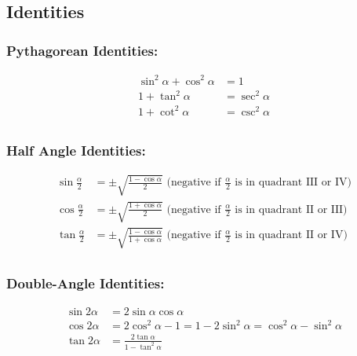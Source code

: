 \documentclass[
]{book}
\begin{document}
\hypertarget{identities-1}{%
\subsection*{Identities}\label{identities-1}}

\hypertarget{pythagorean-identities}{%
\subsubsection*{Pythagorean Identities:}\label{pythagorean-identities}}

\begin{align}
\sin^2{\alpha} + \cos^2{\alpha} &= 1 \\
1 + \tan^2{\alpha} &= \sec^2{\alpha} \\
1 + \cot^2{\alpha} &= \csc^2{\alpha} \\
\end{align}

\hypertarget{half-angle-identities}{%
\subsubsection*{Half Angle Identities:}\label{half-angle-identities}}

\begin{align}
\sin{\frac{\alpha}{2}} &= \pm \sqrt{\frac{1 - \cos{\alpha}}{2}} \text{ (negative if } \frac{\alpha}{2} \text{ is in quadrant III or IV)}\\
\cos{\frac{\alpha}{2}} &= \pm \sqrt{\frac{1 + \cos{\alpha}}{2}} \text{ (negative if } \frac{\alpha}{2} \text{ is in quadrant II or III)}\\
\tan{\frac{\alpha}{2}} &= \pm \sqrt{\frac{1 - \cos{\alpha}}{1 + \cos{\alpha}}} \text{ (negative if } \frac{\alpha}{2} \text{ is in quadrant II or IV)}\\
\end{align}

\hypertarget{double-angle-identities}{%
\subsubsection*{Double-Angle Identities:}\label{double-angle-identities}}

\begin{align}
\sin{2\alpha} &= 2\sin{\alpha}\cos{\alpha}\\
\cos{2\alpha} &= 2\cos^2{\alpha} - 1 = 1 - 2\sin^2{\alpha} = \cos^2{\alpha} - \sin^2{\alpha}\\
\tan{2\alpha} &= \frac{2\tan{\alpha}}{1 - \tan^2{\alpha}}\\
\end{align}
\end{document}
